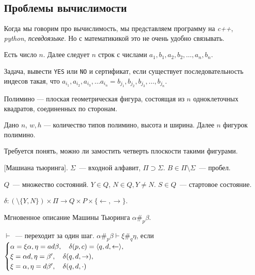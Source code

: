 \subsection{Проблемы вычислимости}
Когда мы говорим про вычислимость, мы представляем программу на \textit{c++}, \textit{python}, \textit{псевдоязыке}. Но с математикикой это не очень удобно связывать.

\begin{problem}
    Есть число $n$. Далее следует $n$ строк с числами $a_1, b_1, a_2, b_2, \dots, a_n, b_n$.

    Задача, вывести \texttt{YES} или \texttt{NO} и сертификат, если существует последовательность индесов такая, что $a_{i_1}, a_{i_2},a_{i_3}, \dots a_{i_n} = b_{j_1}, b_{j_2}, b_{j_3}, \dots, b_{j_n}$.

\end{problem}

\begin{problem}

Полимино --- плоская геометрическая фигура, состоящая из $n$ одноклеточных квадратов, соединенных по сторонам.

Дано $n$, $w, h$ --- количество  типов полимино, высота и ширина.
Далее $n$ фигурок полимино.

Требуется понять, можно ли замостить четверть плоскости такими фигурами.

\end{problem}

\begin{definition}

[Машиана тьюринга].
$\Sigma$~--- входной алфавит, $\Pi \supset \Sigma$.
$B  \in \Pi \setminus \Sigma$~--- пробел.

$Q$~--- множество состояний.
$Y\in Q$, $N \in Q, Y\neq N$.
$S \in Q$~--- стартовое состояние.

$\delta: \left( \setminus \{ Y, N\} \right) \times \Pi \to Q \times P \times \{ \leftarrow, \rightarrow\}$.

Мгновенное описание Машины Тьюринга $\alpha \#_p \beta$.

$\vdash$~--- переходит за один шаг.
$\alpha \#_p \beta \vdash \xi \#_q \eta$, если \\
$\begin{cases}
    \alpha = \xi \alpha, \eta = a d \beta, ~~~ \delta(p, c) = \langle q, d, \leftarrow\rangle,\\
    \xi = \alpha d, \eta = \beta^{\prime}, ~~~\delta(q, d, \rightarrow),\\
    \xi = \alpha, \eta = d \beta^{\prime}, ~~~\delta(q, d, \cdot)
\end{cases}$
\end{definition}

